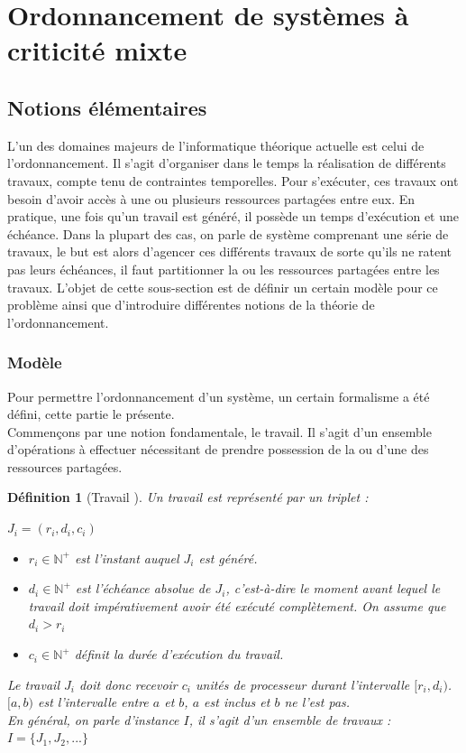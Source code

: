 \documentclass[11pt,a4paper,oneside]{book}
\theoremstyle{break}
\newtheorem{defin}{Définition}
\theoremstyle{breakplain}
\begin{document}
\section{Ordonnancement de systèmes à criticité mixte}
\subsection{Notions élémentaires}
L'un des domaines majeurs de l'informatique théorique actuelle est celui de l'ordonnancement. Il s'agit d'organiser dans le temps la réalisation de différents travaux, compte tenu de contraintes temporelles. Pour s'exécuter, ces travaux ont besoin d'avoir accès à une ou plusieurs ressources partagées entre eux. En pratique, une fois qu'un travail est généré, il possède un temps d'exécution et une échéance. Dans la plupart des cas, on parle de système comprenant une série de travaux, le but est alors d'agencer ces différents travaux de sorte qu'ils ne ratent pas leurs échéances, il faut partitionner la ou les ressources partagées entre les travaux. L'objet de cette sous-section est de définir un certain modèle pour ce problème ainsi que d'introduire différentes notions de la théorie de l'ordonnancement.
\subsubsection{Modèle}
Pour permettre l'ordonnancement d'un système, un certain formalisme a été défini, cette partie le présente.\\

Commençons par une notion fondamentale, le travail. Il s'agit d'un ensemble d'opérations à effectuer nécessitant de prendre possession de la ou d'une des ressources partagées.

\begin{defin}[Travail \cite{goossens2014os}]
Un travail est représenté par un triplet : 
\begin{center}
$J_i = (r_i, d_i, c_i)$
\end{center}
\begin{itemize}
\item $r_i \in \mathbb{N}^{+}$ est l'instant auquel $J_i$ est généré.
\item $d_i \in \mathbb{N}^{+}$ est l'échéance absolue de $J_i$, c'est-à-dire le moment avant lequel le travail doit impérativement avoir été exécuté complètement. On assume que $d_i > r_i$
\item $c_i \in \mathbb{N}^{+}$ définit la durée d'exécution du travail.
\end{itemize}
Le travail $J_i$ doit donc recevoir $c_i$ unités de processeur durant l'intervalle $[r_i, d_i)$. $[a,b)$ est l'intervalle entre $a$ et $b$, $a$ est inclus et $b$ ne l'est pas. \\
En général, on parle d'instance $I$, il s'agit d'un ensemble de travaux : $ I = \{J_1, J_2, ...\} $
\end{defin}
\end{document}
